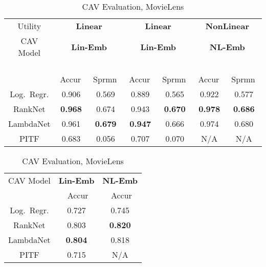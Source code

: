 \documentclass[manuscript,screen,nonacm]{acmart}
\newcommand{\1}{{\mathbf 1}}
\theoremstyle{TheoremNum}
\begin{document}
\begin{table}[t]
\begin{minipage}{0.55\textwidth}
  \centering
  {\footnotesize
  \begin{tabular}{|c||c|c|c|c|c|c|}
  \hline
Utility     &\multicolumn{2}{c|}{\textbf{Linear}} & \multicolumn{2}{c|}{\textbf{Linear}} & \multicolumn{2}{c|}{\textbf{NonLinear}}\\
CAV Model     & \multicolumn{2}{c|}{\textbf{Lin-Emb}} & \multicolumn{2}{c|}{\textbf{Lin-Emb}} & \multicolumn{2}{c|}{\textbf{NL-Emb}}\\
     & \, Accur\, & \, Sprmn\, & \, Accur\, & \, Sprmn\, & \, Accur\, & \, Sprmn\, \\ \hline\hline
 Log.\ Regr. & 0.906  &	0.569 &  0.889 & 0.565	 &  0.922 & 0.577	\\ \hline
 RankNet & \textbf{0.968} &	0.674 & 0.943 & \textbf{0.670}	 &  \textbf{0.978} & \textbf{0.686} 	 \\ \hline
 LambdaNet & 0.961 &	\textbf{0.679} & \textbf{0.947} & 0.666	 &  0.974 & 0.680 \\ \hline	
 PITF & 0.683 & 0.056 & 0.707 & 0.070 & N/A & N/A \\ \hline
 \end{tabular}
 \vspace*{2mm}
  \caption{CAV Evaluation, Synthetic Data (Non-subjective)}
  \label{tab:non_subjective}
  }
   \vspace{-0.2in}
\end{minipage}
\hfill
\begin{minipage}{0.4\textwidth}
  \centering
  {\footnotesize
  \begin{tabular}{|c||c|c|}
  \hline
CAV Model     & {\textbf{Lin-Emb}} & {\textbf{ NL-Emb}}\\
     & \, Accur\, & \, Accur\,\\ \hline\hline
 Log.\ Regr. &  0.727  & 0.745	\\ \hline
 RankNet &  0.803 &	\textbf{0.820} \\ \hline
 LambdaNet & \textbf{0.804} & 0.818	\\ \hline
 PITF & 0.715 & N/A \\ \hline
 \end{tabular}
  }
  \vspace*{2mm}
    \caption{CAV Evaluation, MovieLens}
   \vspace{-0.2in}
  \label{tab:non_subjective_movielens}
  \end{minipage}
\end{table}
\end{document}
